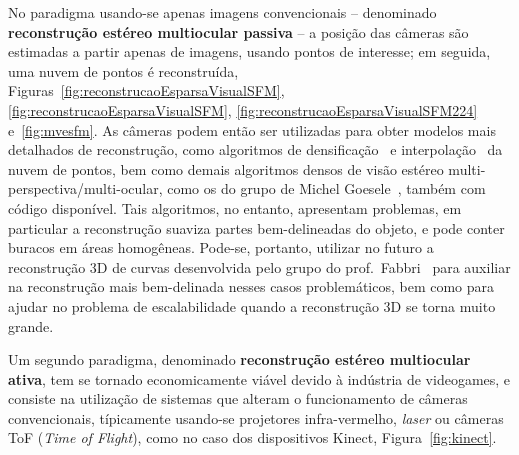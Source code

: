 No paradigma usando-se apenas imagens convencionais -- denominado
\textbf{reconstrução estéreo multiocular passiva} --  a posição das câmeras são
estimadas a partir apenas de imagens, usando pontos de interesse; em seguida, uma
nuvem de pontos é reconstruída,
Figuras~\ref{fig:reconstrucaoEsparsaVisualSFM}, \ref{fig:reconstrucaoEsparsaVisualSFM}, \ref{fig:reconstrucaoEsparsaVisualSFM224}
e~\ref{fig:mvesfm}.
As câmeras podem então ser utilizadas para obter modelos mais detalhados de
reconstrução, como algoritmos de densificação~\cite{furukawa2007dense} e
interpolação~\cite{poisson} da nuvem de pontos, bem como demais algoritmos
densos de visão estéreo multi-perspectiva/multi-ocular, como os do grupo de
Michel Goesele~\cite{mve}, também com código disponível. Tais algoritmos, no
entanto, apresentam problemas, em particular a reconstrução suaviza partes
bem-delineadas do objeto, e pode conter buracos em áreas homogêneas. Pode-se,
portanto, utilizar no futuro a reconstrução 3D de curvas 
desenvolvida pelo grupo do prof.~Fabbri~\cite{Usumezbas:Fabbri:Kimia:ECCV16,Fabbri:Kimia:IJCV2016,Fabbri:Kimia:CVPR10,Fabbri:Giblin:Kimia:ECCV12}
para auxiliar na reconstrução mais bem-delinada nesses casos problemáticos, bem
como para ajudar no problema de escalabilidade quando a reconstrução 3D se torna
muito grande.  

Um segundo paradigma, denominado \textbf{reconstrução estéreo
multiocular ativa}, tem se tornado economicamente viável devido à indústria de videogames, e
consiste na utilização de sistemas que alteram o funcionamento de câmeras
convencionais, típicamente usando-se projetores infra-vermelho, \emph{laser} ou câmeras
ToF (\emph{Time of Flight}), como no caso dos dispositivos Kinect,
Figura~\ref{fig:kinect}.

